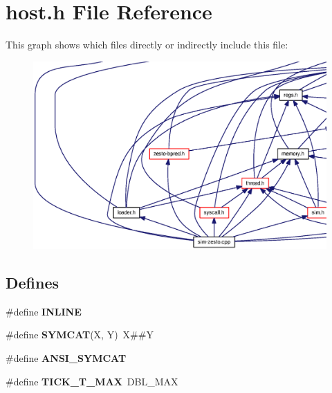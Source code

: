 \section{host.h File Reference}
\label{host_8h}


This graph shows which files directly or indirectly include this file:\nopagebreak
\begin{figure}[H]
\begin{center}
\leavevmode
\includegraphics[width=420pt]{host_8h__dep__incl}
\end{center}
\end{figure}
\subsection*{Defines}
\begin{CompactItemize}
\item 
\#define {\bf INLINE}
\item 
\#define {\bf SYMCAT}(X, Y)~X\#\#Y
\item 
\#define {\bf ANSI\_\-SYMCAT}
\item 
\#define {\bf TICK\_\-T\_\-MAX}~DBL\_\-MAX
\end{CompactItemize}
